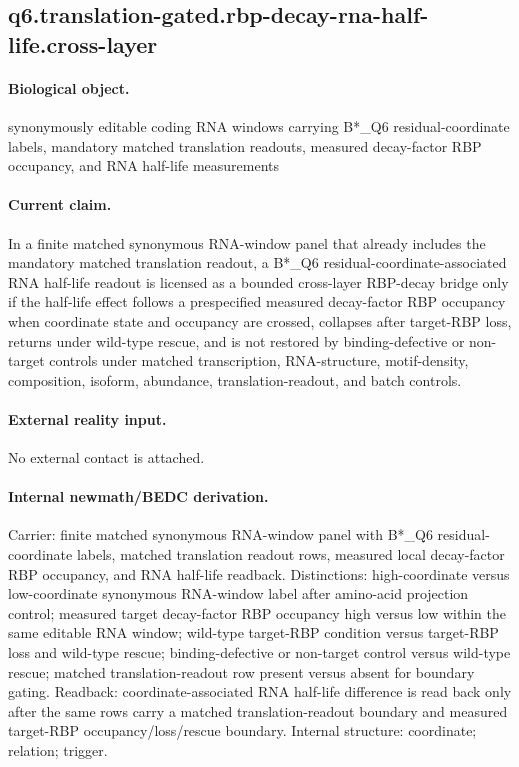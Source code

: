 \subsection{q6.translation-gated.rbp-decay-rna-half-life.cross-layer}

\paragraph{Biological object.} synonymously editable coding RNA windows carrying B*\_Q6 residual-coordinate labels, mandatory matched translation readouts, measured decay-factor RBP occupancy, and RNA half-life measurements

\paragraph{Current claim.} In a finite matched synonymous RNA-window panel that already includes the mandatory matched translation readout, a B*\_Q6 residual-coordinate-associated RNA half-life readout is licensed as a bounded cross-layer RBP-decay bridge only if the half-life effect follows a prespecified measured decay-factor RBP occupancy when coordinate state and occupancy are crossed, collapses after target-RBP loss, returns under wild-type rescue, and is not restored by binding-defective or non-target controls under matched transcription, RNA-structure, motif-density, composition, isoform, abundance, translation-readout, and batch controls.

\paragraph{External reality input.}
No external contact is attached.

\paragraph{Internal newmath/BEDC derivation.} Carrier: finite matched synonymous RNA-window panel with B*\_Q6 residual-coordinate labels, matched translation readout rows, measured local decay-factor RBP occupancy, and RNA half-life readback. Distinctions: high-coordinate versus low-coordinate synonymous RNA-window label after amino-acid projection control; measured target decay-factor RBP occupancy high versus low within the same editable RNA window; wild-type target-RBP condition versus target-RBP loss and wild-type rescue; binding-defective or non-target control versus wild-type rescue; matched translation-readout row present versus absent for boundary gating. Readback: coordinate-associated RNA half-life difference is read back only after the same rows carry a matched translation-readout boundary and measured target-RBP occupancy/loss/rescue boundary. Internal structure: coordinate; relation; trigger.

